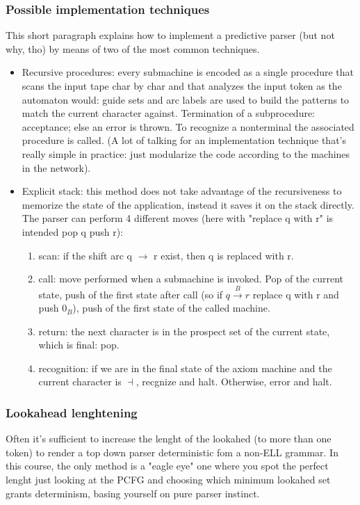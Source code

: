 			\subsubsection{Possible implementation techniques}
				This short paragraph explains how to implement a predictive parser (but not why, tho) by means of two of the most common techniques.
				\begin{itemize}
					\item Recursive procedures: every submachine is encoded as a single procedure that scans the input tape char by char and that analyzes the input 
					token as the automaton would: guide sets and arc labels are used to build the patterns to match the current character against. Termination of a 
					subprocedure: acceptance; else an error is thrown. To recognize a nonterminal the associated procedure is called. (A lot of talking for an 
					implementation technique that's really simple in practice: just modularize the code according to the machines in the network).
					\item Explicit stack: this method does not take advantage of the recursiveness to memorize the state of the application, instead it saves it on 
					the stack directly. The parser can perform 4 different moves (here with "replace q with r" is intended pop q push r):
						\begin{enumerate}
							\item scan: if the shift arc q $\rightarrow$ r exist, then q is replaced with r.
							\item call: move performed when a submachine is invoked. Pop of the current state, push of the first state after call (so if 
							$q \xrightarrow{B} r$ replace q with r and push $0_B$), push of the first state of the called machine.
							\item return: the next character is in the prospect set of the current state, which is final: pop.
							\item recognition: if we are in the final state of the axiom machine and the current character is $\dashv$, recgnize and halt. Otherwise, 
							error and halt.
						\end{enumerate}
				\end{itemize}
				
			\subsubsection{Lookahead lenghtening}
				Often it's sufficient to increase the lenght of the lookahed (to more than one token) to render a top down parser deterministic fom a non-ELL grammar. 
				In this course, the only method is a "eagle eye" one where you spot the perfect lenght just looking at the PCFG and choosing which minimum lookahed 
				set grants determinism, basing yourself on pure parser instinct.
				
